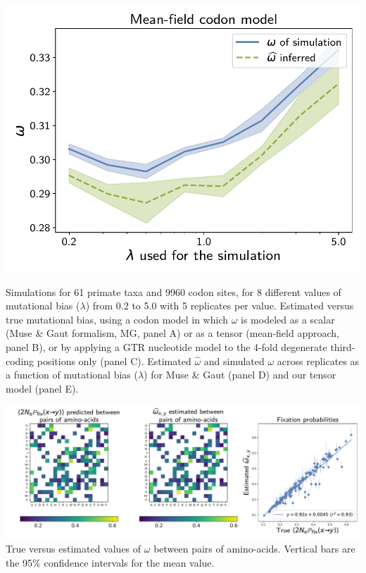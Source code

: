 \documentclass{article}
\begin{document}
\begin{center}
    \begin{minipage}{0.325\linewidth}
        \includegraphics[width=\linewidth, page=1]{inference_supp_mat/PrimatesExons20Mu1.0_omega_MF.pdf}
    \end{minipage}
\end{center}
Simulations for 61 primate taxa and 9960 codon sites, for 8 different values of mutational bias ($\lambda$) from 0.2 to 5.0 with 5 replicates per value.
Estimated versus true mutational bias, using a codon model in which $\omega$ is modeled as a scalar (Muse \& Gaut formalism, MG, panel A) or as a tensor (mean-field approach, panel B), or by applying a GTR nucleotide model to the 4-fold degenerate third-coding positions only (panel C).
Estimated $\hat{\omega}$ and simulated $\omega$ across replicates as a function of mutational bias ($\lambda$) for Muse \& Gaut (panel D) and our tensor model (panel E).

\includegraphics[width=\linewidth, page=1]{inference_supp_mat/PrimatesExons20Mu1.0_omega_pair_MF.pdf}
True versus estimated values of $\omega$ between pairs of amino-acids.
Vertical bars are the 95\% confidence intervals for the mean value.
\end{document}
